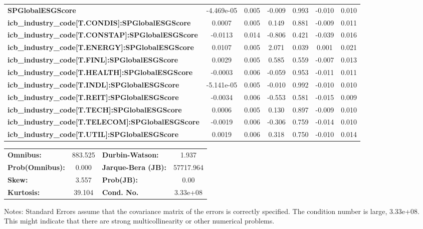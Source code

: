 \begin{center}
\begin{tabular}{lcccccc}
\textbf{SPGlobalESGScore}                                &   -4.469e-05  &        0.005     &    -0.009  &         0.993        &       -0.010    &        0.010     \\
\textbf{icb\_industry\_code[T.CONDIS]:SPGlobalESGScore}  &       0.0007  &        0.005     &     0.149  &         0.881        &       -0.009    &        0.011     \\
\textbf{icb\_industry\_code[T.CONSTAP]:SPGlobalESGScore} &      -0.0113  &        0.014     &    -0.806  &         0.421        &       -0.039    &        0.016     \\
\textbf{icb\_industry\_code[T.ENERGY]:SPGlobalESGScore}  &       0.0107  &        0.005     &     2.071  &         0.039        &        0.001    &        0.021     \\
\textbf{icb\_industry\_code[T.FINL]:SPGlobalESGScore}    &       0.0029  &        0.005     &     0.585  &         0.559        &       -0.007    &        0.013     \\
\textbf{icb\_industry\_code[T.HEALTH]:SPGlobalESGScore}  &      -0.0003  &        0.006     &    -0.059  &         0.953        &       -0.011    &        0.011     \\
\textbf{icb\_industry\_code[T.INDL]:SPGlobalESGScore}    &   -5.141e-05  &        0.005     &    -0.010  &         0.992        &       -0.010    &        0.010     \\
\textbf{icb\_industry\_code[T.REIT]:SPGlobalESGScore}    &      -0.0034  &        0.006     &    -0.553  &         0.581        &       -0.015    &        0.009     \\
\textbf{icb\_industry\_code[T.TECH]:SPGlobalESGScore}    &       0.0006  &        0.005     &     0.130  &         0.897        &       -0.009    &        0.010     \\
\textbf{icb\_industry\_code[T.TELECOM]:SPGlobalESGScore} &      -0.0019  &        0.006     &    -0.306  &         0.759        &       -0.014    &        0.010     \\
\textbf{icb\_industry\_code[T.UTIL]:SPGlobalESGScore}    &       0.0019  &        0.006     &     0.318  &         0.750        &       -0.010    &        0.014     \\
\bottomrule
\end{tabular}
\begin{tabular}{lclc}
\textbf{Omnibus:}       & 883.525 & \textbf{  Durbin-Watson:     } &     1.937  \\
\textbf{Prob(Omnibus):} &   0.000 & \textbf{  Jarque-Bera (JB):  } & 57717.964  \\
\textbf{Skew:}          &   3.557 & \textbf{  Prob(JB):          } &      0.00  \\
\textbf{Kurtosis:}      &  39.104 & \textbf{  Cond. No.          } &  3.33e+08  \\
\bottomrule
\end{tabular}
\end{center}

Notes: \newline
 [1] Standard Errors assume that the covariance matrix of the errors is correctly specified. \newline
 [2] The condition number is large, 3.33e+08. This might indicate that there are \newline
 strong multicollinearity or other numerical problems.